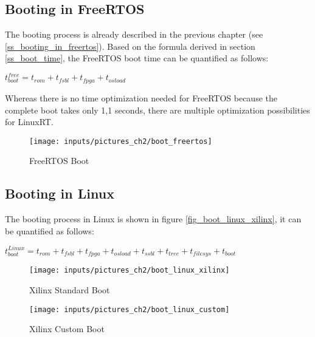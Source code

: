 \subsection{Booting in FreeRTOS}
The booting process is already described in the previous chapter (see \ref{ss_booting_in_freertos}).
Based on the formula derived in section \ref{ss_boot_time}, the FreeRTOS boot time can be quantified as follows:
\par
$t_{boot}^{free} = t_{rom} + t_{fsbl} +  t_{fpga} + t_{osload} $
\par
Whereas there is no time optimization needed for FreeRTOS because the complete boot takes only 1,1 seconds, there are multiple optimization possibilities for LinuxRT. 

\begin{figure}[htb]
		\begin{center}
			\texttt{[image: inputs/pictures\_ch2/boot\_freertos]}
			\caption[FreeRTOS boot]{FreeRTOS Boot \cite{xilinx:zbff}} \label{fig_boot_freertos}
		\end{center}
\end{figure} 

\subsection{Booting in Linux}\label{ss_booting_in_linux}
The booting process in Linux is shown in figure \ref{fig_boot_linux_xilinx}, it can be quantified as follows:
\par
$t_{boot}^{Linux} = t_{rom} + t_{fsbl} +  t_{fpga} + t_{osload} +  t_{ssbl} + t_{tree} + t_{filesys} + t_{boot}$

\begin{figure}[htb]
	\begin{center}
	\begin{minipage}[bth]{6,8cm}
		\begin{center}
			\texttt{[image: inputs/pictures\_ch2/boot\_linux\_xilinx]}
			\caption[Xilinx Standard Boot]{Xilinx Standard Boot \cite{xilinx:zbff}}
		\end{center}	
	\end{minipage}\label{fig_boot_linux_xilinx}
	\hspace{0,5cm}
	\begin{minipage}[bth]{6,8cm}
		\begin{center}
			\texttt{[image: inputs/pictures\_ch2/boot\_linux\_custom]}
			\caption[Xilinx Standard Boot]{Xilinx Custom Boot \cite{xilinx:zbff}} 
		\end{center}
	\end{minipage}\label{fig_boot_linux_custom}
	\end{center}
\end{figure}

